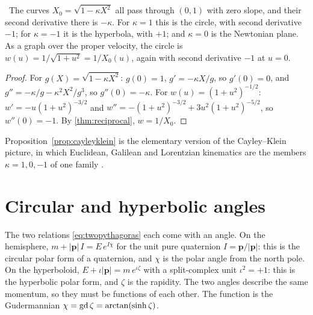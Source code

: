 \begin{proposition}\label{prop:cayleyklein}\ver\
The curves $X_0=\sqrt{1-\kappa X^2}$ all pass through $(0,1)$ with zero slope, and their second derivative there is $-\kappa$. For $\kappa=1$ this is the circle, with second derivative $-1$; for $\kappa=-1$ it is the hyperbola, with $+1$; and $\kappa=0$ is the Newtonian plane. As a graph over the proper velocity, the circle is $w(u)=1/\sqrt{1+u^2}=1/X_0(u)$, again with second derivative $-1$ at $u=0$.
\end{proposition}
\begin{proof}
For $g(X)=\sqrt{1-\kappa X^2}$: $g(0)=1$, $g'=-\kappa X/g$, so $g'(0)=0$, and $g''=-\kappa/g-\kappa^2X^2/g^3$, so $g''(0)=-\kappa$. For $w(u)=(1+u^2)^{-1/2}$: $w'=-u(1+u^2)^{-3/2}$ and $w''=-(1+u^2)^{-3/2}+3u^2(1+u^2)^{-5/2}$, so $w''(0)=-1$. By \cref{thm:reciprocal}, $w=1/X_0$.
\end{proof}


Proposition~\ref{prop:cayleyklein} is the elementary version of the Cayley--Klein picture, in which Euclidean, Galilean and Lorentzian kinematics are the members $\kappa=1,0,-1$ of one family \cite{Yaglom}.

\section{Circular and hyperbolic angles}

The two relations \eqref{eq:twopythagoras} each come with an angle. On the hemisphere, $m+|\mathbf p|\,I=E\,e^{I\chi}$ for the unit pure quaternion $I=\mathbf p/|\mathbf p|$: this is the circular polar form of a quaternion, and $\chi$ is the polar angle from the north pole. On the hyperboloid, $E+\iota|\mathbf p|=m\,e^{\iota\zeta}$ with a split-complex unit $\iota^2=+1$: this is the hyperbolic polar form, and $\zeta$ is the rapidity. The two angles describe the same momentum, so they must be functions of each other. The function is the Gudermannian $\chi=\operatorname{gd}\zeta=\arctan(\sinh\zeta)$.

